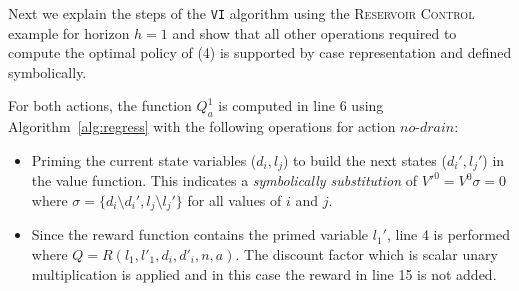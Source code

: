 Next we explain the steps of the \texttt{VI} algorithm using the \textsc{Reservoir Control} example  for horizon $h=1$ and show that all other operations required to compute the optimal policy of (4) is supported by case representation and defined symbolically. 

For both actions, the function $Q^1_a$ is computed in line 6 using Algorithm~\ref{alg:regress} with the following operations for action $\mathit{no}$-$\mathit{drain}$:
\begin{itemize}

\item Priming the current state variables ($d_i,l_j$) to build the next states ($d_i',l_j'$) in the value function. This indicates a \emph{symbolically substitution} of  $V'^0= V^0 \sigma = 0$ where $\sigma = \lbrace d_i \setminus d_i' , l_j \setminus l_j' \rbrace$ for all values of $i$ and $j$. 

\item Since the reward function contains the primed variable $l_1'$, line 4 is performed where $Q = R(l_1,l'_1,d_i,d'_i,n,a) $. The discount factor which is scalar unary multiplication is applied and in this case the reward in line 15 is not added.


\end{itemize}
